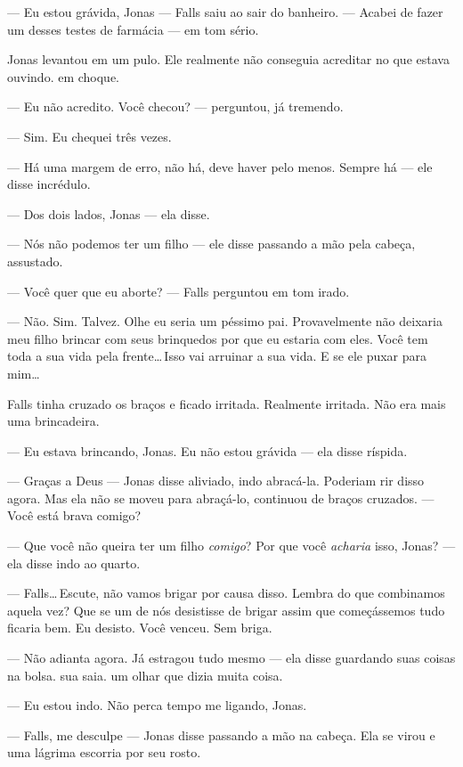 --- Eu estou grávida, Jonas --- Falls saiu ao sair do banheiro. --- Acabei de fazer um desses testes de farmácia --- em tom sério.

Jonas levantou em um pulo. Ele realmente não conseguia acreditar no que estava ouvindo.  em choque.

--- Eu não acredito. Você checou? --- perguntou, já tremendo.

--- Sim. Eu chequei três vezes.

--- Há uma margem de erro, não há, deve haver\mudanca{,} pelo menos. Sempre há --- ele disse\mudanca{,} incrédulo.

--- Dos dois lados, Jonas --- ela disse.

--- Nós não podemos ter um filho --- ele disse\mudanca{,} passando a mão pela cabeça, assustado.

--- Você quer que eu aborte? --- Falls perguntou em tom irado.

--- Não. Sim. Talvez. Olhe\mudanca{,} eu seria um péssimo pai. Provavelmente não deixaria meu filho brincar com seus brinquedos\mudanca{,} por que eu estaria com eles. Você tem toda a sua vida pela frente\ldots\,Isso vai arruinar a sua vida. E se ele puxar para mim\ldots

Falls tinha cruzado os braços e ficado irritada. Realmente irritada. Não era mais uma brincadeira.

--- Eu estava brincando, Jonas. Eu não estou grávida --- ela disse\mudanca{,} ríspida.

--- Graças a Deus --- Jonas disse\mudanca{,} aliviado, indo abracá-la. Poderiam rir disso agora. Mas ela não se moveu para abraçá-lo, continuou de braços cruzados. --- Você está brava comigo?

--- Que você não queira ter um filho \emph{comigo}? Por que você \emph{acharia} isso, Jonas? --- ela disse\mudanca{,} indo ao quarto.

--- Falls\ldots\,Escute, não vamos brigar por causa disso. Lembra do que combinamos aquela vez? Que se um de nós desistisse de brigar assim que começássemos\mudanca{,} tudo ficaria bem. Eu desisto. Você venceu. Sem briga.

--- Não adianta agora. Já estragou tudo mesmo --- ela disse\mudanca{,} guardando suas coisas na bolsa.  sua saia.  um olhar que dizia muita coisa.

--- Eu estou indo. Não perca tempo me ligando, Jonas.

--- Falls, me desculpe --- Jonas disse\mudanca{,} passando a mão na cabeça. Ela se virou e uma lágrima escorria por seu rosto.

